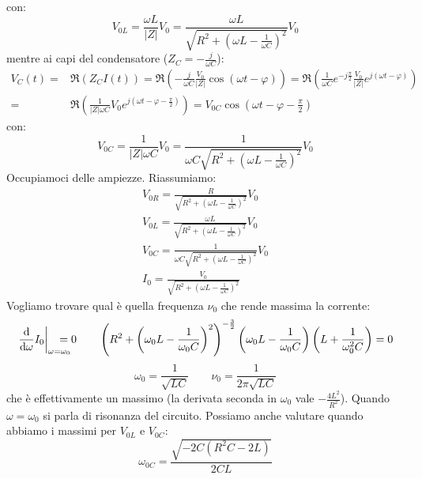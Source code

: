con:
\begin{equation}
  V_{0L}=\frac{\omega L}{|Z|}V_0=\frac{\omega L}{\sqrt{R^2+\left(\omega L-\frac{1}{\omega C}\right)^2}}V_0
\end{equation}
mentre ai capi del condensatore ($Z_C=-\frac{j}{\omega C}$):
\begin{equation}
  \begin{split}
    V_{C}(t)=&\Re(Z_CI(t))=\Re\left(-\frac{j}{\omega C}\frac{V_0}{|Z|}\cos(\omega t-\varphi)\right)=\Re\left(\frac{1}{\omega C}e^{-j\frac{\pi}{2}}\frac{V_0}{|Z|}e^{j(\omega t-\varphi)}\right)\\
    =&\Re\left(\frac{1}{|Z|\omega C}V_0e^{j\left(\omega t-\varphi-\frac{\pi}{2}\right)}\right)=V_{0C}\cos\left(\omega t-\varphi-\frac{\pi}{2}\right)
  \end{split}
\end{equation}
con:
\begin{equation}
  V_{0C}=\frac{1}{|Z|\omega C}V_0=\frac{1}{\omega C\sqrt{R^2+\left(\omega L-\frac{1}{\omega C}\right)^2}}V_0
\end{equation}
Occupiamoci delle ampiezze. Riassumiamo:
\begin{subequations}
  \begin{gather}
    V_{0R}=\frac{R}{\sqrt{R^2+\left(\omega L-\frac{1}{\omega C}\right)^2}}V_0\\
    V_{0L}=\frac{\omega L}{\sqrt{R^2+\left(\omega L-\frac{1}{\omega C}\right)^2}}V_0\\
    V_{0C}=\frac{1}{\omega C\sqrt{R^2+\left(\omega L-\frac{1}{\omega C}\right)^2}}V_0\\
    I_0=\frac{V_0}{\sqrt{R^2+\left(\omega L-\frac{1}{\omega C}\right)^2}}
  \end{gather}
\end{subequations}
Vogliamo trovare qual è quella frequenza $\nu_0$ che rende massima la corrente:
\[
  \left.\frac{\ud}{\ud \omega}I_0\right|_{\omega=\omega_0}\!\!\!\!\!\!\!\!=0\qquad
  \left(R^2+\left(\omega_0 L-\frac{1}{\omega_0 C}\right)^2\right)^{-\frac{3}{2}}\left(\omega_0 L-\frac{1}{\omega_0 C}\right)\left(L+\frac{1}{\omega_0 ^2 C}\right)=0
\]
\begin{equation}
  \omega_0=\frac{1}{\sqrt{LC}}\qquad \nu_0=\frac{1}{2\pi\sqrt{LC}}
\end{equation}
che è effettivamente un massimo (la derivata seconda in $\omega_0$ vale $-\frac{4L^2}{R^2}$). Quando $\omega=\omega_0$ si parla di risonanza del circuito.
Possiamo anche valutare quando abbiamo i massimi per $V_{0L}$ e $V_{0C}$:
\begin{equation}
  \omega_{0C}=\frac{\sqrt{-2C(R^2C-2L)}}{2CL}
\end{equation}

